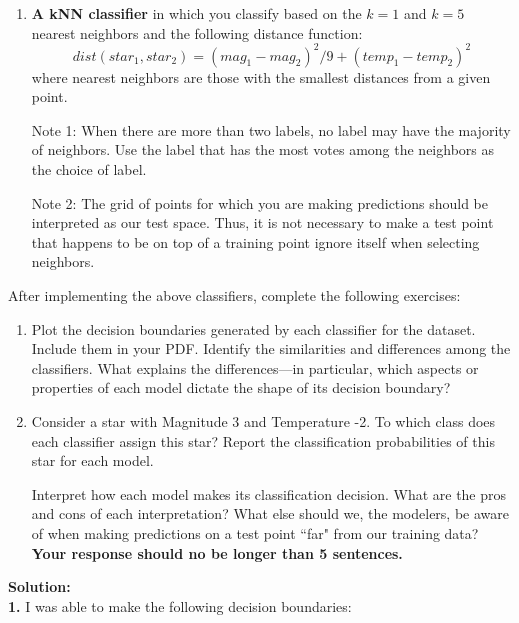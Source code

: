 \documentclass[submit]{harvardml}
\begin{document}
\begin{problem}
\begin{enumerate}[label=\alph*)]
\item \textbf{A kNN classifier} in which you classify based on the $k = 1$ and $k = 5$ nearest neighbors and the following distance function: $$dist(star_1, star_2) = (mag_1 - mag_2)^2/9 + (temp_1 - temp_2)^2$$
where nearest neighbors are those with the smallest distances from a given point.

  Note 1: When there are more than two labels, no label may have the
  majority of neighbors.  Use the label that has the most votes among
  the neighbors as the choice of label. 

  Note 2: The grid of points for which you are making predictions
  should be interpreted as our test space.  Thus, it is not necessary
  to make a test point that happens to be on top of a training point
  ignore itself when selecting neighbors.

\end{enumerate}

After implementing the above classifiers, complete the following exercises:

\begin{enumerate}
    \item Plot the decision boundaries generated by each classifier for the dataset. Include them in your PDF. 
    Identify the similarities and differences among the classifiers. What explains the differences---in particular, which aspects or properties of each model dictate the shape of its decision boundary? 
    
    \item 
    
    Consider a star with Magnitude 3 and Temperature -2. To which class does each classifier assign this star? Report the classification probabilities of this star for each model. 
    
    Interpret how each model makes its classification decision. What are the pros and cons of each interpretation? What else should we, the modelers, be aware of when making predictions on a test point ``far" from our training data? \textbf{Your response should no be longer than 5 sentences.}
\end{enumerate}
\end{problem}

\newpage
\textbf{Solution:} \\
\textbf{1.} I was able to make the following decision boundaries: 
\end{document}
